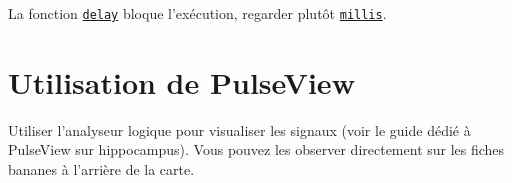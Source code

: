 \documentclass[11pt]{paper}
\begin{document}
La fonction \href{https://www.arduino.cc/reference/en/language/functions/time/delay/}{\tt delay} bloque l'exécution, regarder plutôt \href{https://www.arduino.cc/reference/en/language/functions/time/millis/}{\texttt{millis}}.

  \section{Utilisation de PulseView}

Utiliser l'analyseur logique pour visualiser les signaux (voir le guide dédié à PulseView sur hippocampus). Vous pouvez les observer directement sur les fiches bananes à l'arrière de la carte. 
\end{document}
